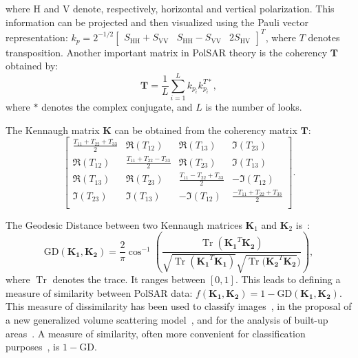 \documentclass[conference]{IEEEtran}
\DeclareMathOperator{\Tr}{Tr}
\begin{document}
where $\text{H}$ and $\text{V}$ denote, respectively, horizontal and vertical polarization.
This information can be projected and then visualized using the Pauli vector representation:
$k_p = 2^{-1/2} 
\begin{bmatrix}
S_{\text{HH}} + S_{\text{VV}} &S_{\text{HH}} - S_{\text{VV}} &2S_{\text{HV}}
\end{bmatrix}^T
$, 
where $T$ denotes transposition. 
Another important matrix in PolSAR theory is the coherency $\bm{T}$ obtained by:
$$
\mathbf{T} = \frac{1}{L}\sum_{i=1}^{L}k_{p_i}k_{p_i}^{T*},
$$
where $*$ denotes the complex conjugate, and $L$ is the number of looks.

The Kennaugh matrix $\mathbf{K}$ can be obtained from the coherency matrix $\mathbf{T}$:
\[
\begin{bmatrix}
\frac{ T_{11} + T_{22} + T_{33} }{2} & \Re(T_{12}) & \Re(T_{13}) & \Im(T_{23})\\
\Re(T_{12}) & \frac{T_{11} + T_{22} - T_{33}}{2} & \Re(T_{23}) & \Im(T_{13})\\
\Re(T_{13}) & \Re(T_{23}) & \frac{ T_{11} - T_{22} + T_{33} }{2} & -\Im(T_{12})\\
\Im(T_{23}) & \Im(T_{13}) & -\Im(T_{12}) & \frac{ -T_{11} + T_{22} + T_{33} }{2}\\
\end{bmatrix}
.\]

The Geodesic Distance between two Kennaugh matrices $\bm K_1$ and $\bm K_2$ is~\cite{ClassificationPolSARGeodesic}: 
\begin{displaymath}
\text{GD}(\mathbf{K_1}, \mathbf{K_2}) = \frac{2}{\pi} \cos^{-1} \left(\frac{\Tr(\mathbf{K_1}^T \mathbf{K_2})}{\sqrt{\Tr(\mathbf{K_1}^T \mathbf{K_1})} \sqrt{\Tr(\mathbf{K_2}^T \mathbf{K_2}})} \right),
\end{displaymath}
where $\Tr$ denotes the trace.
It ranges between $[0,1]$.
This leads to defining a measure of similarity between PolSAR data: $f(\mathbf{K_1}, \mathbf{K_2}) = 1 - \text{GD}(\mathbf{K_1}, \mathbf{K_2})$. 
This measure of dissimilarity has been used to 
classify images~\cite{ClassificationPolSARGeodesic},
in the proposal of a new generalized volume scattering model~\cite{AGeneralizedVolumeScatteringModelBasedVegetationIndexfromPolarimetricSARData2019},
and for the analysis of built-up areas~\cite{NovelTechniquesforBuiltupAreaExtractionfromPolarimetricSARImages2019}.
A measure of similarity, often more convenient for classification purposes~\cite{FreryCorreiaFreitas:ClassifMultifrequency:IEEE:2007}, is $1-\text{GD}$.
\end{document}
